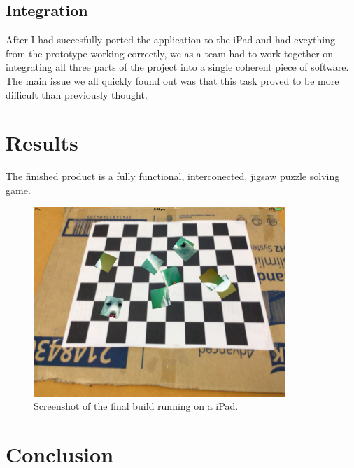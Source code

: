 \documentclass{article}
\begin{document}
\subsection{Integration}
After I had succesfully ported the application to the iPad and had eveything from the prototype working correctly, we as a team had to work together on integrating all three parts of the project into a single coherent piece of software. The main issue we all quickly found out was that this task proved to be more difficult than previously thought. 


\section{Results}
The finished product is a fully functional, interconected, jigsaw puzzle solving game.

\begin{figure}[ht]
\begin{center}
\includegraphics[width=0.85\textwidth]{images/iPadFinalImage}
\caption{Screenshot of the final build running on a iPad.}
\label{fig:iPadFinal}
\end{center}
\end{figure}


\section{Conclusion}
\end{document}
